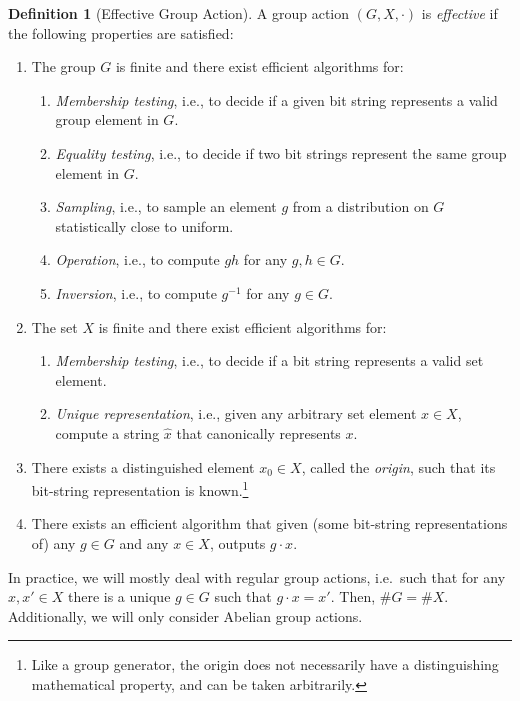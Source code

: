 \documentclass[10pt]{article}
\theoremstyle{plain}
\theoremstyle{definition}
\newtheorem{definition}[theorem]{Definition}
\begin{document}
\begin{prposition}
\begin{definition}[Effective Group Action]
  A group action $(G,X,·)$ is \emph{effective} if the following
  properties are satisfied:
  \begin{enumerate}
  \item The group $G$ is finite and there exist efficient algorithms
    for:
    \begin{enumerate}
    \item \emph{Membership testing}, i.e., to decide if a given bit string
      represents a valid group element in $G$.
    \item \emph{Equality testing}, i.e., to decide if two bit strings
      represent the same group element in $G$.
    \item \emph{Sampling}, i.e., to sample an element $g$ from a
      distribution on $G$ statistically close to uniform.
    \item \emph{Operation}, i.e., to compute $gh$ for any $g,h\in G$.
    \item \emph{Inversion}, i.e., to compute $g^{-1}$ for any
      $g\in G$.
    \end{enumerate}
  \item The set $X$ is finite and there exist efficient algorithms for:
    \begin{enumerate}
    \item \emph{Membership testing}, i.e., to decide if a bit string
      represents a valid set element.
    \item \emph{Unique representation}, i.e., given any arbitrary set element $x\in X$, compute a string $\hat{x}$ that canonically represents $x$.
    \end{enumerate}
  \item There exists a distinguished element $x_0\in X$, called the
    \emph{origin}, such that its bit-string representation is
    known.\footnote{Like a group generator, the origin does not
      necessarily have a distinguishing mathematical property, and can
      be taken arbitrarily.}
  \item There exists an efficient algorithm that given (some
    bit-string representations of) any $g\in G$ and any $x\in X$,
    outputs $g · x$.
  \end{enumerate}
\end{definition}

In practice, we will mostly deal with regular group actions, i.e.\
such that for any $x, x' ∈ X$ there is a unique $g ∈ G$ such that
$g · x = x'$. %
Then, $\#G = \#X$. %
Additionally, we will only consider Abelian group actions.


\end{prposition}
\end{document}
